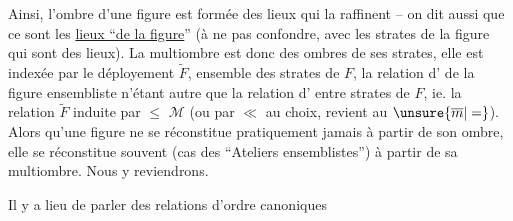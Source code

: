Ainsi, l'ombre d'une figure est formée des lieux qui la raffinent -- on dit aussi que ce sont les \uline{lieux ``de la figure}'' (à ne pas confondre, avec les strates de la figure qui sont des lieux). La multiombre est donc  des ombres de ses strates, elle est indexée par le déployement $\widetilde F$, ensemble des strates de $F$, la relation d' de la figure ensembliste n'étant autre que la relation d' entre strates de $F$, ie. la relation  $\widetilde F$ induite par $\leq$  $\mathcal{M}$ (ou par $\ll$ au choix,  revient au $\unsure{\overline m|=}$). Alors qu'une figure ne se réconstitue pratiquement jamais à partir de son ombre, elle se réconstitue  souvent (cas des ``Ateliers ensemblistes'') à partir de sa multiombre. Nous y reviendrons.

 Il y a lieu de parler des relations d'ordre canoniques
